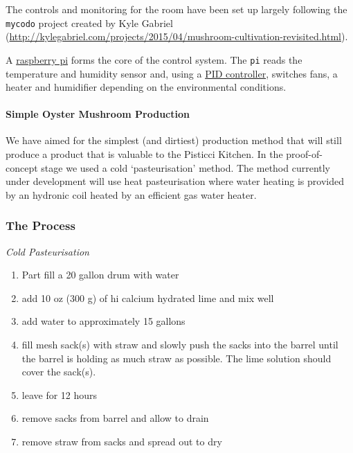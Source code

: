 The controls and monitoring for the room have been set up largely
following the \texttt{mycodo} project created by Kyle Gabriel
(\url{http://kylegabriel.com/projects/2015/04/mushroom-cultivation-revisited.html}).

A
\href{https://www.raspberrypi.org/products/raspberry-pi-2-model-b/}{raspberry
pi} forms the core of the control system. The \texttt{pi} reads the
temperature and humidity sensor and, using a
\href{http://www.csimn.com/CSI_pages/PIDforDummies.html}{PID
controller}, switches fans, a heater and humidifier depending on the
environmental conditions.

\paragraph{Simple Oyster Mushroom
Production}\label{simple-oyster-mushroom-production}

We have aimed for the simplest (and dirtiest) production method that
will still produce a product that is valuable to the Pisticci Kitchen.
In the proof-of-concept stage we used a cold `pasteurisation' method.
The method currently under development will use heat pasteurisation
where water heating is provided by an hydronic coil heated by an
efficient gas water heater.

\subsubsection{The Process}\label{the-process}

\emph{Cold Pasteurisation}

\begin{enumerate}
\def\labelenumi{\arabic{enumi}.}
\itemsep1pt\parskip0pt
\item
  Part fill a 20 gallon drum with water
\item
  add 10 oz (300 g) of hi calcium hydrated lime and mix well
\item
  add water to approximately 15 gallons
\item
  fill mesh sack(s) with straw and slowly push the sacks into the barrel
  until the barrel is holding as much straw as possible. The lime
  solution should cover the sack(s).
\item
  leave for 12 hours
\item
  remove sacks from barrel and allow to drain
\item
  remove straw from sacks and spread out to dry
\end{enumerate}

